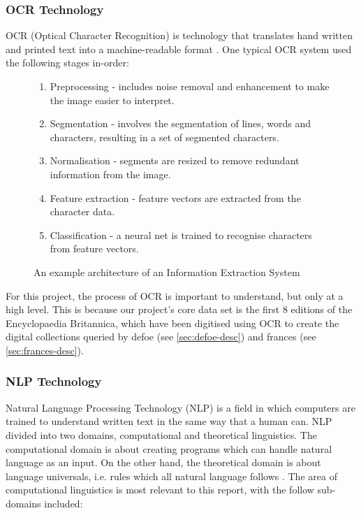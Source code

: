 \documentclass[12pt, letterpaper]{article}
\begin{document}
\subsubsection{OCR Technology}\label{sec:context-ocr}

\begin{flushleft}
OCR (Optical Character Recognition) is technology that translates hand written and printed text into a machine-readable format \cite{ocr-trends}. One typical OCR system used the following stages in-order:
\end{flushleft}

\begin{flushleft}
\begin{figure}[H]
\begin{enumerate}
\item Preprocessing - includes noise removal and enhancement to make the image easier to interpret.
\item Segmentation - involves the segmentation of lines, words and characters, resulting in a set of segmented characters. 
\item Normalisation - segments are resized to remove redundant information from the image.
\item Feature extraction - feature vectors are extracted from the character data.
\item Classification - a neural net is trained to recognise characters from feature vectors.
\end{enumerate}
\caption{An example architecture of an Information Extraction System \cite{ocr-trends}}
\end{figure}
\end{flushleft}

\begin{flushleft}
For this project, the process of OCR is important to understand, but only at a high level. This is because our project's core data set is the first 8 editions of the Encyclopaedia Britannica, which have been digitised using OCR to create the digital collections queried by defoe (see \ref{sec:defoe-desc}) and frances (see \ref{sec:frances-desc}).
\end{flushleft}

\subsubsection{NLP Technology}\label{sec:context-nlp}

\begin{flushleft}
Natural Language Processing Technology (NLP) is a field in which computers are trained to understand written text in the same way that a human can. NLP divided into two domains, computational and theoretical linguistics. The computational domain is about creating programs which can handle natural language as an input. On the other hand, the theoretical domain is about language universals, i.e. rules which all natural language follows \cite{nlp-fundamentals}. The area of computational linguistics is most relevant to this report, with the follow sub-domains included:
\end{flushleft}
\end{document}

